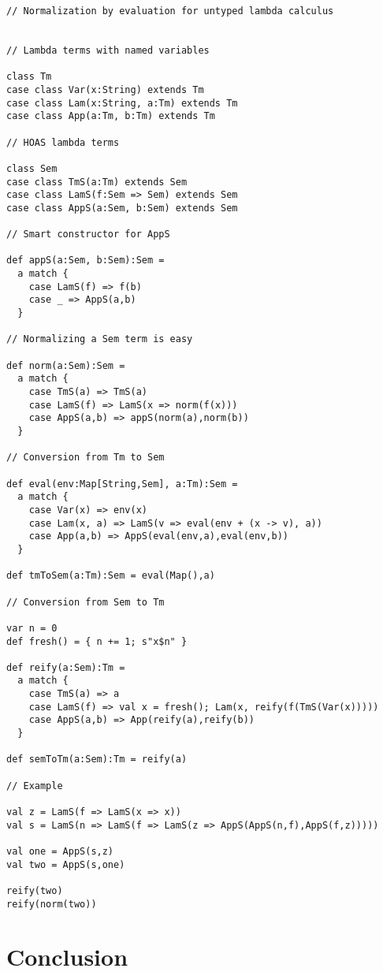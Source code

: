 \documentclass[a4paper, 11pt]{article}
\theoremstyle{definition}
\begin{document}
\cite{pfenning88}
\cite{berger91}

\begin{lstlisting}
// Normalization by evaluation for untyped lambda calculus


// Lambda terms with named variables

class Tm
case class Var(x:String) extends Tm
case class Lam(x:String, a:Tm) extends Tm
case class App(a:Tm, b:Tm) extends Tm

// HOAS lambda terms

class Sem
case class TmS(a:Tm) extends Sem
case class LamS(f:Sem => Sem) extends Sem
case class AppS(a:Sem, b:Sem) extends Sem

// Smart constructor for AppS

def appS(a:Sem, b:Sem):Sem =
  a match {
    case LamS(f) => f(b)
    case _ => AppS(a,b)
  }

// Normalizing a Sem term is easy

def norm(a:Sem):Sem =
  a match {
    case TmS(a) => TmS(a)
    case LamS(f) => LamS(x => norm(f(x)))
    case AppS(a,b) => appS(norm(a),norm(b))
  }

// Conversion from Tm to Sem

def eval(env:Map[String,Sem], a:Tm):Sem =
  a match {
    case Var(x) => env(x)
    case Lam(x, a) => LamS(v => eval(env + (x -> v), a))
    case App(a,b) => AppS(eval(env,a),eval(env,b))
  }

def tmToSem(a:Tm):Sem = eval(Map(),a)

// Conversion from Sem to Tm

var n = 0
def fresh() = { n += 1; s"x$n" }

def reify(a:Sem):Tm =
  a match {
    case TmS(a) => a
    case LamS(f) => val x = fresh(); Lam(x, reify(f(TmS(Var(x)))))
    case AppS(a,b) => App(reify(a),reify(b))
  }

def semToTm(a:Sem):Tm = reify(a)

// Example

val z = LamS(f => LamS(x => x))
val s = LamS(n => LamS(f => LamS(z => AppS(AppS(n,f),AppS(f,z)))))

val one = AppS(s,z)
val two = AppS(s,one)

reify(two)
reify(norm(two))
\end{lstlisting}

\section{Conclusion}



\end{document}
